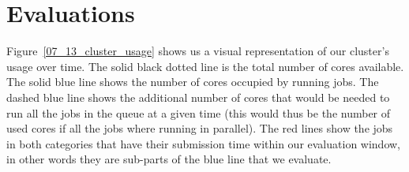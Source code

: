 \documentclass[conference,10pt]{IEEEtran}
\begin{document}
\section{Evaluations}\label{sec.evaluations}

Figure~\ref{07_13_cluster_usage} shows us a visual representation of 
our cluster's usage over time. The solid black dotted line is the total
number of cores available.
The solid blue line shows the number of cores occupied by running jobs.
The dashed blue line shows the additional number of cores that would be needed
to run all the jobs in the queue at a given time (this would thus be the number
of used cores if all the jobs where running in parallel).
The red lines show the jobs in both categories that have their submission
time within our evaluation window, in other words they are sub-parts of the blue line
that we evaluate.
\end{document}
